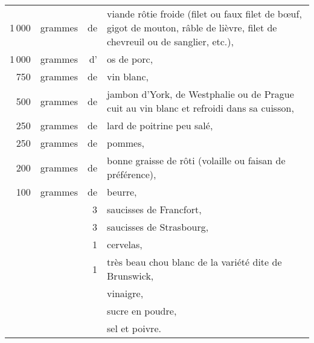 \footnotesize
\begin{longtable}{rrrp{16em}}
  1 000 & grammes & de & viande rôtie froide (filet ou faux filet de bœuf, gigot de mouton,
                         râble de lièvre, filet de chevreuil ou de sanglier, etc.),                       \\
  1 000 & grammes & d' & os de porc,                                                                      \\
    750 & grammes & de & vin blanc,                                                                       \\
    500 & grammes & de & jambon d'York, de Westphalie ou de Prague cuit au vin blanc et refroidi
                         dans sa cuisson,                                                                 \\
    250 & grammes & de & lard de poitrine peu salé,                                                       \\
    250 & grammes & de & pommes,                                                                          \\
    200 & grammes & de & bonne graisse de rôti (volaille ou faisan de préférence),                        \\
    100 & grammes & de & beurre,                                                                          \\
        &         &  3 & saucisses de Francfort,                                                          \\
        &         &  3 & saucisses de Strasbourg,                                                         \\
        &         &  1 & cervelas,                                                                        \\
        &         &  1 & très beau chou blanc de la variété dite de Brunswick,                            \\
        &         &    & vinaigre,                                                                        \\
        &         &    & sucre en poudre,                                                                 \\
        &         &    & sel et poivre.                                                                   \\
\end{longtable}
\normalsize


